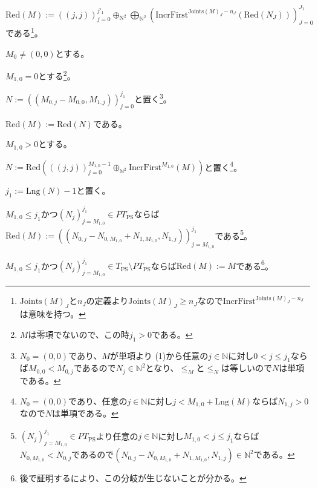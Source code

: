 \documentclass[dvipdfmx,uplatex]{jsarticle}
\theoremstyle{customnonumberbreakfortheorem}
\theoremstyle{customnonumberbreakforproof}
\begin{document}
\begin{nenumerate}
\begin{nenumerate}
\begin{nenumerate}
\begin{nenumerate}
			\end{nenumerate}
			\item \(\textrm{Red}(M) := ((j,j))_{j=0}^{j'_1} \oplus_{\textrm{N}^2} \bigoplus_{\mathbb{N}^2} (\textrm{IncrFirst}^{\textrm{Joints}(M)_J-n_J}(\textrm{Red}(N_J)))_{J=0}^{J_1}\)である\footnote{\(\textrm{Joints}(M)_J\)と\(n_J\)の定義より\(\textrm{Joints}(M)_J \geq n_J\)なので\(\textrm{IncrFirst}^{\textrm{Joints}(M)_J-n_J}\)は意味を持つ。}。
		\end{nenumerate}
		\item \(M_0 \neq (0,0)\)とする。
		\begin{nenumerate}
			\item \(M_{1,0} = 0\)とする\footnote{\(M\)は零項でないので、この時\(j_1 > 0\)である。}。
			\begin{nenumerate}
				\item \(N := ((M_{0,j} - M_{0,0},M_{1,j}))_{j=0}^{j_1}\)と置く\footnote{\(N_0 = (0,0)\)であり、\(M\)が単項より (1)から任意の\(j \in \mathbb{N}\)に対し\(0 < j \leq j_1\)ならば\(M_{0,0} < M_{0,j}\)であるので\(N_j \in \mathbb{N}^2\)となり、\(\leq_M\)と\(\leq_N\)は等しいので\(N\)は単項である。}。
				\item \(\textrm{Red}(M) := \textrm{Red}(N)\)である。
			\end{nenumerate}
			\item \(M_{1,0} > 0\)とする。
			\begin{nenumerate}
				\item \(N := \textrm{Red}(((j,j))_{j=0}^{M_{1,0}-1} \oplus_{\mathbb{N}^2} \textrm{IncrFirst}^{M_{1,0}}(M))\)と置く\footnote{\(N_0 = (0,0)\)であり、任意の\(j \in \mathbb{N}\)に対し\(j < M_{1,0} + \textrm{Lng}(M)\)ならば\(N_{1,j} > 0\)なので\(N\)は単項である。}。
				\item \(j_1 := \textrm{Lng}(N) - 1\)と置く。
				\begin{nenumerate}
					\item \(M_{1,0} \leq j_1\)かつ\((N_j)_{j=M_{1,0}}^{j_1} \in PT_{\textrm{PS}}\)ならば\(\textrm{Red}(M) := ((N_{0,j}-N_{0,M_{1,0}}+N_{1,M_{1,0}},N_{1,j}))_{j=M_{1,0}}^{j_1}\)である\footnote{\((N_j)_{j=M_{1,0}}^{j_1} \in PT_{\textrm{PS}}\)より任意の\(j \in \mathbb{N}\)に対し\(M_{1,0} < j \leq j_1\)ならば\(N_{0,M_{1,0}} < N_{0,j}\)であるので\((N_{0,j}-N_{0,M_{1,0}}+N_{1,M_{1,0}},N_{1,j}) \in \mathbb{N}^2\)である。}。
					\item \(M_{1,0} \leq j_1\)かつ\((N_j)_{j=M_{1,0}}^{j_1} \in T_{\textrm{PS}} \setminus PT_{\textrm{PS}}\)ならば\(\textrm{Red}(M) := M\)である\footnote{後で証明するにより、この分岐が生じないことが分かる。}。

\end{nenumerate}
\end{nenumerate}
\end{nenumerate}
\end{nenumerate}
\end{nenumerate}
\end{document}
